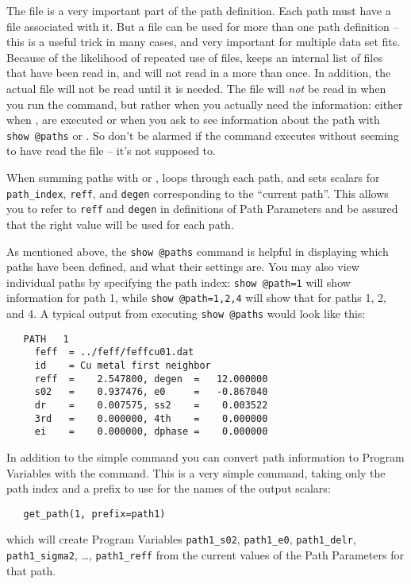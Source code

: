 The {\feffndat} file is a very important part of the path definition.  Each
path must have a {\feffndat} file associated with it.  But a {\feffndat}
file can be used for more than one path definition -- this is a useful
trick in many cases, and very important for multiple data set fits.
Because of the likelihood of repeated use of {\feffndat} files, {\ifeffit}
keeps an internal list of {\feffndat} files that have been read in, and
will not read in a {\feffndat} more than once.  In addition, the actual
{\feffndat} file will not be read until it is needed.  The file will
{\emph{not}} be read in when you run the {} command, but rather
when you actually need the information: either when {},
{} are executed or when you ask to see information about the
path with {\tt{show @paths}} or {}.  So don't be alarmed if
the {} command executes without seeming to have read the
{\feffndat} file -- it's not supposed to.{}


When summing paths with {} or {}, {\ifeffit}
loops through each path, and sets scalars for {\tt{path\_index}},
{\tt{reff}}, and {\tt{degen}} corresponding to the ``current path''.  This
allows you to refer to {\tt{reff}} and {\tt{degen}} in definitions of Path
Parameters and be assured that the right value will be used for each path.
{  
  }
 
As mentioned above, the {\tt{show @paths}} command is helpful in displaying
which paths have been defined, and what their settings are.  You may also
view individual paths by specifying the path index: {\tt{show @path=1}}
will show information for path 1, while {\tt{show @path=1,2,4}} will show
that for paths 1, 2, and 4.  A typical output from executing {\tt{show
    @paths}} would look like this:
\begin{verbatim}
   PATH   1
     feff  = ../feff/feffcu01.dat
     id    = Cu metal first neighbor
     reff  =    2.547800, degen  =   12.000000
     s02   =    0.937476, e0     =   -0.867040
     dr    =    0.007575, ss2    =    0.003522
     3rd   =    0.000000, 4th    =    0.000000
     ei    =    0.000000, dphase =    0.000000
\end{verbatim}
\noindent

In addition to the simple {} command you can convert path
information to Program Variables with the {} command.  This
is a very simple command, taking only the path index and a prefix to use
for the names of the output scalars: {}
\begin{verbatim}
   get_path(1, prefix=path1)
\end{verbatim}
\noindent
which will create Program Variables {\tt{path1\_s02}}, {\tt{path1\_e0}},
{\tt{path1\_delr}}, {\tt{path1\_sigma2}}, \ldots, {\tt{path1\_reff}} from
the current values of the Path Parameters for that path.

